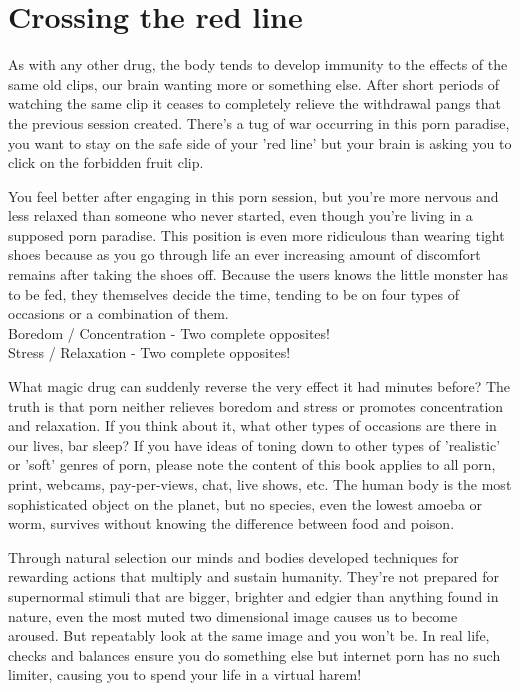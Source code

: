 \documentclass[
]{book}
\begin{document}
\hypertarget{crossing-the-red-line}{%
\section{Crossing the red line}\label{crossing-the-red-line}}

As with any other drug, the body tends to develop immunity to the effects of the same old clips, our brain wanting more or something else. After short periods of watching the same clip it ceases to completely relieve the withdrawal pangs that the previous session created. There's a tug of war occurring in this porn paradise, you want to stay on the safe side of your 'red line' but your brain is asking you to click on the forbidden fruit clip.

You feel better after engaging in this porn session, but you're more nervous and less relaxed than someone who never started, even though you're living in a supposed porn paradise. This position is even more ridiculous than wearing tight shoes because as you go through life an ever increasing amount of discomfort remains after taking the shoes off. Because the users knows the little monster has to be fed, they themselves decide the time, tending to be on four types of occasions or a combination of them.\\
Boredom / Concentration - Two complete opposites!\\
Stress / Relaxation - Two complete opposites!

What magic drug can suddenly reverse the very effect it had minutes before? The truth is that porn neither relieves boredom and stress or promotes concentration and relaxation. If you think about it, what other types of occasions are there in our lives, bar sleep? If you have ideas of toning down to other types of 'realistic' or 'soft' genres of porn, please note the content of this book applies to all porn, print, webcams, pay-per-views, chat, live shows, etc. The human body is the most sophisticated object on the planet, but no species, even the lowest amoeba or worm, survives without knowing the difference between food and poison.

Through natural selection our minds and bodies developed techniques for rewarding actions that multiply and sustain humanity. They're not prepared for supernormal stimuli that are bigger, brighter and edgier than anything found in nature, even the most muted two dimensional image causes us to become aroused. But repeatably look at the same image and you won't be. In real life, checks and balances ensure you do something else but internet porn has no such limiter, causing you to spend your life in a virtual harem!
\end{document}
